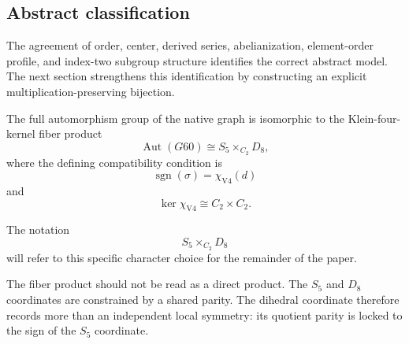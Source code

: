 \subsection{Abstract classification}

The agreement of order, center, derived series, abelianization,
element-order profile, and index-two subgroup structure identifies the
correct abstract model. The next section strengthens this identification
by constructing an explicit multiplication-preserving bijection.

\begin{theorem}
\label{thm:fiber-product-identification}
The full automorphism group of the native graph is isomorphic to the
Klein-four-kernel fiber product
\[
\operatorname{Aut}(G60)
\cong
S_5\times_{C_2}D_8,
\]
where the defining compatibility condition is
\[
\operatorname{sgn}(\sigma)=\chi_{\mathrm{V4}}(d)
\]
and
\[
\ker\chi_{\mathrm{V4}}\cong C_2\times C_2.
\]
\end{theorem}

The notation
\[
S_5\times_{C_2}D_8
\]
will refer to this specific character choice for the remainder of the
paper.

The fiber product should not be read as a direct product. The $S_5$ and
$D_8$ coordinates are constrained by a shared parity. The dihedral
coordinate therefore records more than an independent local symmetry:
its quotient parity is locked to the sign of the $S_5$ coordinate.
